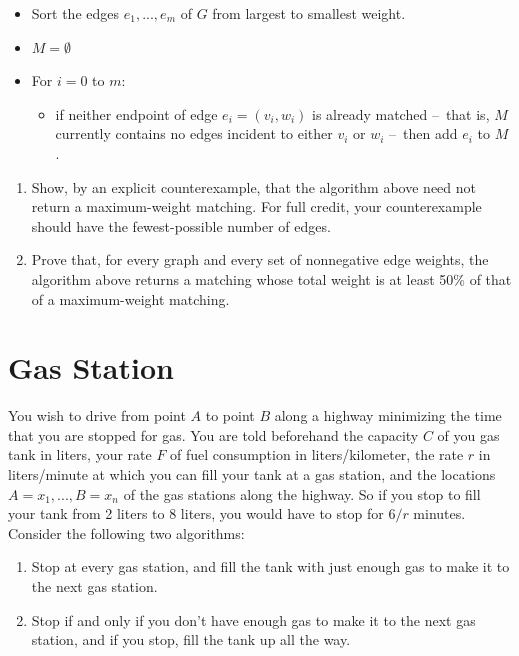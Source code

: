 \documentclass{article}
\begin{document}
\begin{itemize}
  \item Sort the edges $e_1, ..., e_m$ of $G$ from largest to smallest weight.
  \item $M = \emptyset$
  \item For $i=0$ to $m$:
  \begin{itemize}
    \item if neither endpoint of edge $e_i = (v_i, w_i)$ is already matched \---\ that is, $M$ currently contains no edges incident to either $v_i$ or $w_i$ \---\ then add $e_i$ to $M$.
  \end{itemize}
\end{itemize}

\begin{enumerate}[label=(\alph*)]
  \item Show, by an explicit counterexample, that the algorithm above need not return a maximum-weight matching. For full credit, your counterexample should have the fewest-possible number of edges.
  \item Prove that, for every graph and every set of nonnegative edge weights, the algorithm above returns a matching whose total weight is at least 50\% of that of a maximum-weight matching. 
\end{enumerate}

\section{Gas Station}
You wish to drive from point $A$ to point $B$ along a highway minimizing the time that you are stopped for gas. You are told beforehand the capacity $C$ of you gas tank in liters, your rate $F$ of fuel consumption in liters/kilometer, the rate $r$ in liters/minute at which you can fill your tank at a gas station, and the locations $A=x_1, ..., B = x_n$ of the gas stations along the highway. So if you stop to fill your tank from 2 liters to 8 liters, you would have to stop for $6/r$ minutes. Consider the following two algorithms:

\begin{enumerate}[label=(\alph*)]
  \item Stop at every gas station, and fill the tank with just enough gas to make it to the next gas station.
  \item Stop if and only if you don’t have enough gas to make it to the next gas station, and if you stop, fill the tank up all the way.
\end{enumerate}
\end{document}
